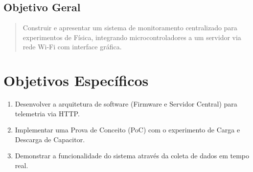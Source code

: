 \subsection{Objetivo Geral}
\begin{quote}
Construir e apresentar um sistema de monitoramento centralizado para experimentos de Física, integrando microcontroladores a um servidor via rede Wi-Fi com interface gráfica.
\end{quote}
\section{Objetivos Específicos}

\begin{enumerate}
    \item Desenvolver a arquitetura de software (Firmware e Servidor Central) para telemetria via HTTP.
    \item Implementar uma Prova de Conceito (PoC) com o experimento de Carga e Descarga de Capacitor.
    \item Demonstrar a funcionalidade do sistema através da coleta de dados em tempo real.
\end{enumerate}
